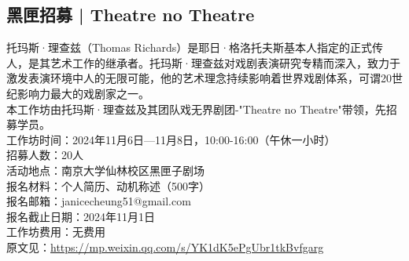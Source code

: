 \documentclass[letterpaper, 12pt]{article}
\begin{document}
\begin{multicols}{2}
\section{黑匣招募 | Theatre no Theatre}
托玛斯·理查兹（Thomas Richards）是耶日·格洛托夫斯基本人指定的正式传人，是其艺术工作的继承者。托玛斯·理查兹对戏剧表演研究专精而深入，致力于激发表演环境中人的无限可能，他的艺术理念持续影响着世界戏剧体系，可谓20世纪影响力最大的戏剧家之一。\\
本工作坊由托玛斯·理查兹及其团队戏无界剧团-"Theatre no Theatre"带领，先招募学员。\\
工作坊时间：2024年11月6日—11月8日，10:00-16:00（午休一小时）\\
招募人数：20人\\
活动地点：南京大学仙林校区黑匣子剧场\\
报名材料：个人简历、动机称述（500字）\\
报名邮箱：janicecheung51@gmail.com\\
报名截止日期：2024年11月1日\\
工作坊费用：无费用\\
原文见：\url{https://mp.weixin.qq.com/s/YK1dK5ePgUbr1tkBvfgarg}
\end{multicols}
\end{document}
